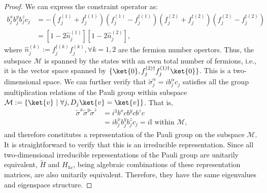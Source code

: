 \begin{proof}
We can express the constraint operator as:
\begin{align*}
b_j^x b_j^y b_j^z c_j &= -(f_j^{(1)}+f_j^{\dagger(1)})(f_j^{(1)}-f_j^{\dagger(1)})(f_j^{(2)}+f_j^{\dagger(2)})(f_j^{(2)}-f_j^{\dagger(2)}) \\
&= [1 - 2\hat{n}_j^{(1)}][1 - 2\hat{n}_j^{(2)}],
\end{align*}
where $\hat{n}_j^{(k)}:=f_j^{\dagger(k)}f_j^{(k)} , \forall k = 1,2$ are the fermion number opertors. 
Thus, the subspace $\mathcal{M}$ is spanned by the states with an even total number of fermions, i.e., it is the vector space spanned by $\{\ket{0}, f_j^{(2)\dagger} f_j^{(1)\dagger}\ket{0}\}$. This is a two-dimensional space.
We can further verify that $\tilde{\sigma}_j^{\alpha} = i b_j^{\alpha}c_j$ satisfies all the group multiplication relations of the Pauli group within subspace $\mathcal{M}:= \{\ket{v} ~|~\forall j, D_j\ket{v} =  \ket{v}\}$.  That is,
\begin{align}
    \tilde \sigma^{x} \tilde \sigma^y \tilde \sigma^z &= i^3 b^{x}cb^{y}c b^{z}c\\
    &=i b_j^x b_j^y b_j^zc_j = i\mathbb{I} \text{~within~} \mathcal{M},
\end{align}
and therefore constitutes a representation of the Pauli group on the subspace $\mathcal{M}$.
It is straightforward to verify that this is an irreducible representation. Since all two-dimensional irreducible representations of the Pauli group are unitarily equivalent, $\tilde{H}$ and $H_{hc}$, being algebraic combinations of these representation matrices, are also unitarily equivalent. Therefore, they have the same eigenvalues and eigenspace structure.
\end{proof}


